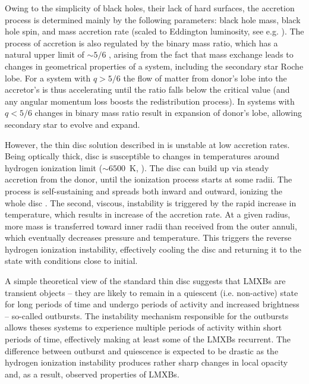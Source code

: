 Owing to the simplicity of black holes, their lack of hard surfaces, the accretion process is determined mainly by the following parameters: black hole mass, black hole spin, and mass accretion rate (scaled to Eddington luminosity, see e.g. \citealt{Done2007}).
The process of accretion is also regulated by the binary mass ratio, which has a natural upper limit of $\sim 5/6$ \citep{AccretionPower}, arising from the fact that mass exchange leads to changes in geometrical properties of a system, including the secondary star Roche lobe.
For a system with $q > 5/6$ the flow of matter from donor's lobe into the accretor's is thus accelerating until the ratio falls below the critical value (and any angular momentum loss boosts the redistribution process).
In systems with $q < 5/6$ changes in binary mass ratio result in expansion of donor's lobe, allowing secondary star to evolve and expand.


However, the thin disc solution described in \citet{Shakura1973} is unstable at low accretion rates.
Being optically thick, disc is susceptible to changes in temperatures around hydrogen ionization limit ($\sim 6500$~K, \citealt{Mineshige1993}).
The disc can build up via steady accretion from the donor, until the ionization process starts at some radii.
The process is self-sustaining and spreads both inward and outward, ionizing the whole disc \citep{Lasota2001, Dubus2001}.
The second, viscous, instability is triggered by the rapid increase in temperature, which results in increase of the accretion rate.
At a given radius, more mass is transferred toward inner radii than received from the outer annuli, which eventually decreases pressure and temperature.
This triggers the reverse hydrogen ionization instability, effectively cooling the disc and returning it to the state with conditions close to initial.


A simple theoretical view of the standard thin disc suggests that \glspl{LMXB} are transient objects -- they are likely to remain in a quiescent (i.e. non-active) state for long periods of time and undergo periods of activity and increased brightness -- so-called outbursts.
The instability mechanism responsible for the outbursts allows theses systems to experience multiple periods of activity within short periods of time, effectively making at least some of the \glspl{LMXB} recurrent.
The difference between outburst and quiescence is expected to be drastic as the hydrogen ionization instability produces rather sharp changes in local opacity and, as a result, observed properties of \glspl{LMXB}.



